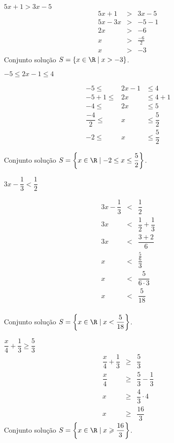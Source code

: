   \begin{exem} 
  $5x +1 > 3x - 5$
  \begin{eqnarray*}
  5x +1 &>& 3x - 5 \\
  5x - 3x &>& -5 - 1 \\
  2x &>& -6 \\
  x &>& \frac{-6}{2} \\
  x &>& -3
  \end{eqnarray*}
  Conjunto solução $S=\{x \in \R \mid x > -3\}$.
 \end{exem}
 
  \begin{exem} 
  $-5 \leq 2x - 1 \leq 4$
   
   \begin{eqnarray*}
    -5  \leq  & 2x - 1 & \leq  4 \\
  -5 + 1 \leq & 2x & \leq 4 + 1 \\
  -4 \leq & 2x & \leq 5 \\
   \dfrac{-4}{2} \leq & x & \leq \dfrac{5}{2} \\
  -2 \leq & x &  \leq \dfrac{5}{2} 
   \end{eqnarray*}
      
  Conjunto solução $S= \left\{x \in \R \mid -2 \leq x \leq \dfrac{5}{2} \right\}$.
 \end{exem}
 
 \begin{exem} 
 $3x - \dfrac{1}{3} < \dfrac{1}{2}$
 
 \begin{eqnarray*}
  3x - \dfrac{1}{3} &<& \dfrac{1}{2} \\
  3x  &<& \dfrac{1}{2} + \dfrac{1}{3} \\
  3x  &<& \dfrac{3 + 2}{6} \\
  x  &<& \dfrac{\frac{5}{6}}{3} \\
  x  &<& \dfrac{5}{6 \cdot 3} \\
  x  &<& \dfrac{5}{18} \\
  \end{eqnarray*}
  
  Conjunto solução $S= \left\{x \in \R \mid x < \dfrac{5}{18} \right\}$.
 \end{exem}
 
  \begin{exem} 
 $\dfrac{x}{4} + \dfrac{1}{3} \geqslant \dfrac{5}{3}$
 \begin{eqnarray*}
  \dfrac{x}{4} + \dfrac{1}{3} & \geqslant & \dfrac{5}{3} \\
  \dfrac{x}{4} & \geqslant & \dfrac{5}{3} - \dfrac{1}{3} \\
  x & \geqslant & \dfrac{4}{3} \cdot 4 \\
  x & \geqslant & \dfrac{16}{3}
  \end{eqnarray*}
  Conjunto solução $S= \left\{x \in \R \mid x \geqslant \dfrac{16}{3} \right\}$.
 \end{exem}
 

